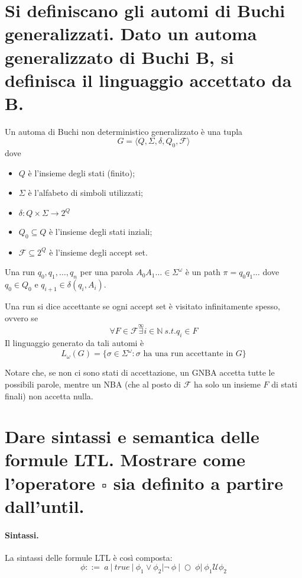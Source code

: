 \documentclass[a4paper,11pt]{article}
\newcommand{\until}{\mathcal{U}}
\begin{document}
	\section{Si definiscano gli automi di Buchi generalizzati. Dato un automa generalizzato di Buchi B, si definisca il linguaggio accettato da B.}

	Un automa di Buchi non deterministico generalizzato è una tupla \[ G = \langle Q, \Sigma, \delta, Q_0, \mathcal{F}\rangle \]
	dove \begin{itemize}
		\item $Q$ è l'insieme degli stati (finito);
		\item $\Sigma $ è l'alfabeto di simboli utilizzati;
		\item $\delta : Q \times \Sigma \to 2^Q$
		\item $Q_0 \subseteq Q$ è l'insieme degli stati inziali;
		\item $\mathcal{F} \subseteq 2^Q$ è l'insieme degli accept set.
	\end{itemize}

	Una run $q_0, q_1, \dots, q_n$ per una parola $A_0A_1\dots\in\Sigma^\omega$ è un path $\pi = q_0q_1\dots$ dove $q_0 \in Q_0$ e $q_{i+1}\in\delta (q_i, A_i)$. 
	
	Una run si dice accettante se ogni accept set è visitato infinitamente spesso, ovvero se \[ \forall F \in \mathcal{F} \overset{\infty}{\exists} i \in \mathbb{N}\ s.t. q_i \in F\]
	Il linguaggio generato da tali automi è \[ L_\omega(G) = \lbrace\sigma\in\Sigma^\omega :\sigma \text{ ha una run accettante in } G \rbrace \]

	Notare che, se non ci sono stati di accettazione, un GNBA accetta tutte le possibili parole, mentre un NBA (che al posto di $\mathcal{F}$ ha solo un insieme $F$ di stati finali) non accetta nulla.

	\section{Dare sintassi e semantica delle formule LTL. Mostrare come l'operatore $\square$ sia definito a partire dall'until.}

	\paragraph{Sintassi.} La sintassi delle formule LTL è così composta: \[ \phi ::=\ a\ \vert\ true\ \vert\ \phi_1 \vee \phi_2 \vert \neg\ \phi\ \vert\ \bigcirc\ \phi \vert\ \phi_1 \until \phi_2  \]
\end{document}
